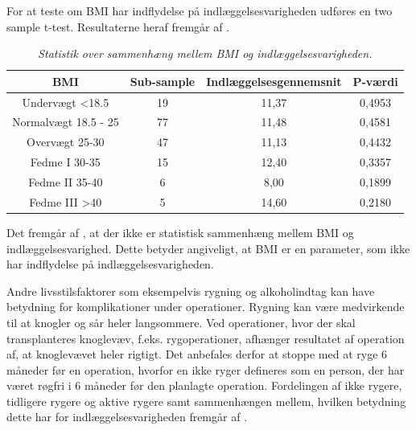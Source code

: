 For at teste om BMI har indflydelse på indlæggelsesvarigheden udføres en two sample t-test. Resultaterne heraf fremgår af .

\begin{table}[H]
\centering
\begin{tabular}{|c|c|c|c|}
\hline
\textbf{BMI}         & \textbf{Sub-sample} & \textbf{Indlæggelsesgennemsnit} & \textbf{P-værdi} \\ \hline
Undervægt \textless18.5  & 19                  & 11,37                           & 0,4953           \\ \hline
Normalvægt 18.5 - 25     & 77                  & 11,48                           & 0,4581           \\ \hline
Overvægt 25-30           & 47                  & 11,13                           & 0,4432           \\ \hline
Fedme I 30-35            & 15                  & 12,40                           & 0,3357           \\ \hline
Fedme II 35-40           & 6                   & 8,00                            & 0,1899           \\ \hline
Fedme III \textgreater40 & 5                   & 14,60                           & 0,2180           \\ \hline
\end{tabular}
\caption{\textit{Statistik over sammenhæng mellem BMI og indlæggelsesvarigheden.}}
\label{BMIindlaegtab}
\end{table}

\noindent
Det fremgår af , at der ikke er statistisk sammenhæng mellem BMI og indlæggelsesvarighed. Dette betyder angiveligt, at BMI er en parameter, som ikke har indflydelse på indlæggelsesvarigheden. 

Andre livsstilsfaktorer som eksempelvis rygning og alkoholindtag kan have betydning for komplikationer under operationer. Rygning kan være medvirkende til at knogler og sår heler langsommere. Ved operationer, hvor der skal transplanteres knoglevæv, f.eks. rygoperationer, afhænger resultatet af operation af, at knoglevævet heler rigtigt. Det anbefales derfor at stoppe med at ryge 6 måneder før en operation, hvorfor en ikke ryger defineres som en person, der har været røgfri i 6 måneder før den planlagte operation.\cite{Nordjylland2014} Fordelingen af ikke rygere, tidligere rygere og aktive rygere samt sammenhængen mellem, hvilken betydning dette har for indlæggelsesvarigheden fremgår af .


